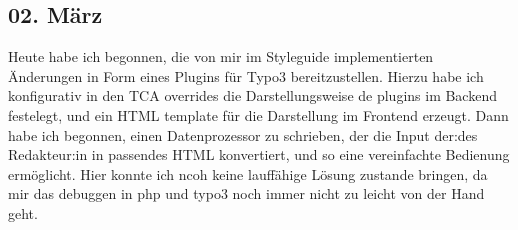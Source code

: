 \subsection{02. März}
Heute habe ich begonnen, die von mir im Styleguide implementierten Änderungen in Form eines Plugins für Typo3 bereitzustellen. Hierzu habe ich konfigurativ in den TCA overrides die Darstellungsweise de plugins im Backend festelegt, und ein HTML template für die Darstellung im Frontend erzeugt. Dann habe ich begonnen, einen Datenprozessor zu schrieben, der die Input der:des Redakteur:in in passendes HTML konvertiert, und so eine vereinfachte Bedienung ermöglicht. Hier konnte ich ncoh keine lauffähige Lösung zustande bringen, da mir das debuggen in php und typo3 noch immer nicht zu leicht von der Hand geht.
